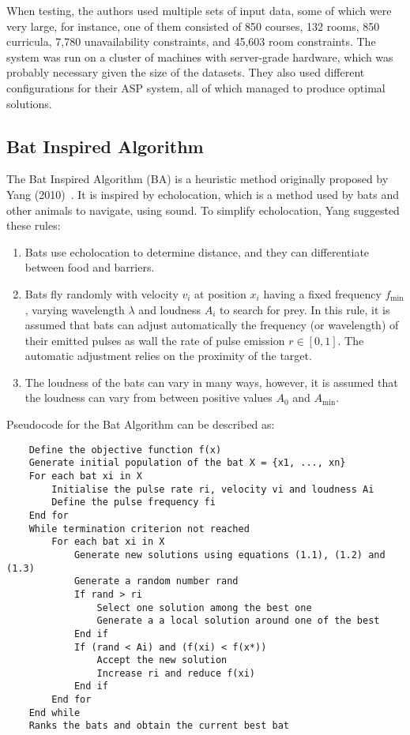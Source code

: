 \documentclass[a4paper, 12pt]{report}
\begin{document}
When testing, the authors used multiple sets of input data, some of which were 
very large, for instance, one of them consisted of 850 courses, 132 rooms, 850 
curricula, 7,780 unavailability constraints, and 45,603 room constraints.
The system was run on a cluster of machines with server-grade hardware, which 
was probably necessary given the size of the datasets.
They also used different configurations for their ASP system, all of which 
managed to produce optimal solutions.

\subsection{Bat Inspired Algorithm}

The Bat Inspired Algorithm (BA) is a heuristic method originally proposed by 
Yang (2010)~\cite{yang_bat}.
It is inspired by echolocation, which is a method used by bats and other animals
to navigate, using sound.
To simplify echolocation, Yang suggested these rules:
\begin{enumerate}
	\item Bats use echolocation to determine distance, and they can
		differentiate between food and barriers.
	\item Bats fly randomly with velocity \( v_i \) at position \( x_i \) having
		a fixed frequency \( f_{\min} \), varying wavelength \( \lambda \) and 
		loudness \( A_i \) to search for prey.
		In this rule, it is assumed that bats can adjust automatically the
		frequency (or wavelength) of their emitted pulses as wall the rate of
		pulse emission \( r \in [0,1] \).
		The automatic adjustment relies on the proximity of the target.
	\item The loudness of the bats can vary in many ways, however, it is assumed
		that the loudness can vary from between positive values \( A_0 \) and 
		\( A_{\min} \).
\end{enumerate}
Pseudocode for the Bat Algorithm can be described as:
\begin{verbatim}
	Define the objective function f(x)
	Generate initial population of the bat X = {x1, ..., xn}
	For each bat xi in X
	    Initialise the pulse rate ri, velocity vi and loudness Ai
	    Define the pulse frequency fi
	End for
	While termination criterion not reached
	    For each bat xi in X
	        Generate new solutions using equations (1.1), (1.2) and (1.3)
	        Generate a random number rand
	        If rand > ri
	            Select one solution among the best one
	            Generate a a local solution around one of the best
	        End if
	        If (rand < Ai) and (f(xi) < f(x*))
	            Accept the new solution
	            Increase ri and reduce f(xi)
	        End if
	    End for
	End while
	Ranks the bats and obtain the current best bat
\end{verbatim}
~\cite{ba_example}
\end{document}

